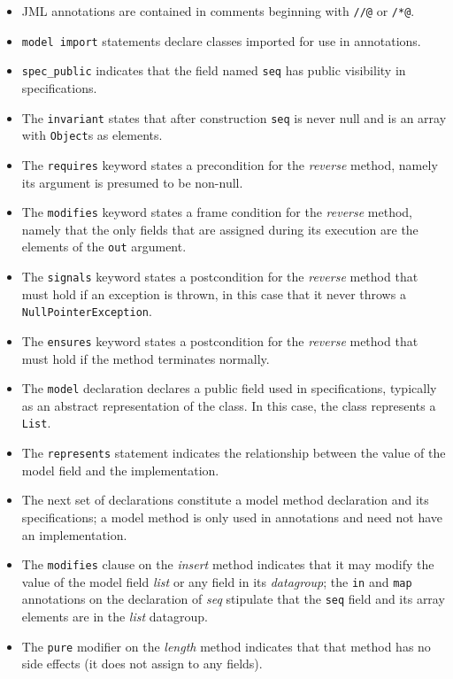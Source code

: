 \documentclass{llncs}
\begin{document}
\begin{itemize}
\item JML annotations are contained in comments beginning with \texttt{//@} or \texttt{/*@}.
\item \texttt{model import} statements declare classes imported for use in annotations.
\item \texttt{spec\_public} indicates that the field named \texttt{seq} has public visibility in specifications.
\item The \texttt{invariant} states that after construction \texttt{seq} is never null and is an array with \texttt{Object}s as elements.
\item The \texttt{requires} keyword states a precondition for the {\em reverse} method, namely 
its argument is presumed to be non-null.
\item The \texttt{modifies} keyword states a frame condition for the {\em reverse} method, namely 
that the only fields that are assigned during its execution are the elements of the \texttt{out} argument.
\item The \texttt{signals} keyword states a postcondition for the {\em reverse} method that must hold if an exception is thrown, in this case 
that it never throws a \texttt{NullPointerException}.
\item The \texttt{ensures} keyword states a postcondition for the {\em reverse} method that must hold if the method terminates normally.
\item The \texttt{model} declaration declares a public field used in specifications, typically as an abstract representation of the class.  In this case, the class represents a \texttt{List}.
\item The \texttt{represents} statement indicates the relationship between the value of the model
field and the implementation.
\item The next set of declarations constitute a model method declaration and its specifications;
a model method is only used in annotations and need not have an implementation.
\item The \texttt{modifies} clause on the {\em insert} method indicates that it may modify the value
of the model field {\em list} or any field in its {\em datagroup}; the \texttt{in} and \texttt{map} annotations on the declaration of
{\em seq} stipulate that the \texttt{seq} field and its array elements are in the {\em list} datagroup.
\item The \texttt{pure} modifier on the {\em length} method indicates that that method has no
side effects (it does not assign to any fields).
\end{itemize}
\end{document}

